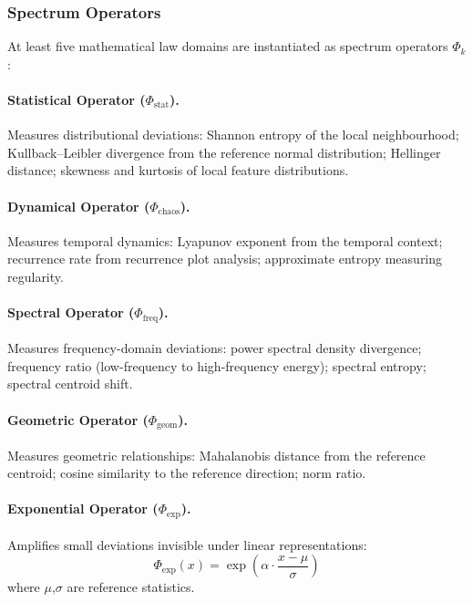 \documentclass[12pt,a4paper]{article}
\begin{document}
\subsubsection{Spectrum Operators}

At least five mathematical law domains are instantiated as spectrum
operators $\Phi_k$:

\paragraph{Statistical Operator ($\Phi_{\mathrm{stat}}$).}
Measures distributional deviations: Shannon entropy of the local
neighbourhood; Kullback--Leibler divergence from the reference normal
distribution; Hellinger distance; skewness and kurtosis of local feature
distributions.

\paragraph{Dynamical Operator ($\Phi_{\mathrm{chaos}}$).}
Measures temporal dynamics: Lyapunov exponent from the temporal context;
recurrence rate from recurrence plot analysis; approximate entropy
measuring regularity.

\paragraph{Spectral Operator ($\Phi_{\mathrm{freq}}$).}
Measures frequency-domain deviations: power spectral density divergence;
frequency ratio (low-frequency to high-frequency energy); spectral entropy;
spectral centroid shift.

\paragraph{Geometric Operator ($\Phi_{\mathrm{geom}}$).}
Measures geometric relationships: Mahalanobis distance from the reference
centroid; cosine similarity to the reference direction; norm ratio.

\paragraph{Exponential Operator ($\Phi_{\mathrm{exp}}$).}
Amplifies small deviations invisible under linear representations:
\begin{equation}
\Phi_{\mathrm{exp}}(x) = \exp\!\left(\alpha\cdot\frac{x-\mu}{\sigma}
\right)
\end{equation}
where $\mu$,$\sigma$ are reference statistics.
\end{document}

